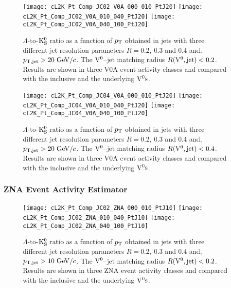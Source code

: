 \documentclass[12pt]{article}
\begin{document}
\begin{figure}[htbp]
\centering
\texttt{[image: cL2K\_Pt\_Comp\_JC02\_V0A\_000\_010\_PtJ20]}
\texttt{[image: cL2K\_Pt\_Comp\_JC02\_V0A\_010\_040\_PtJ20]}
\texttt{[image: cL2K\_Pt\_Comp\_JC02\_V0A\_040\_100\_PtJ20]}
\caption{$\Lambda$-to-${\rm K}_{\rm S}^{0}$ ratio as a function of $p_{\rm T}$
  obtained in jets with three different jet resolution
  parameters $R=0.2,~0.3$ and $0.4$ and, $p_{\rm T,jet}>20~{\rm GeV}/c$.
  The ${\rm V}^{0}$--jet matching radius $R({\rm V}^{0},{\rm jet})<0.2$.
  Results are shown in three V0A event activity classes and
  compared with the inclusive and the underlying ${\rm V}^{0}{\rm s}$.}
\label{fig:s01L2KJC02V0APtj20}
\end{figure}

\begin{figure}[htbp]
\centering
\texttt{[image: cL2K\_Pt\_Comp\_JC04\_V0A\_000\_010\_PtJ20]}
\texttt{[image: cL2K\_Pt\_Comp\_JC04\_V0A\_010\_040\_PtJ20]}
\texttt{[image: cL2K\_Pt\_Comp\_JC04\_V0A\_040\_100\_PtJ20]}
\caption{$\Lambda$-to-${\rm K}_{\rm S}^{0}$ ratio as a function of $p_{\rm T}$
  obtained in jets with three different jet resolution
  parameters $R=0.2,~0.3$ and $0.4$ and, $p_{\rm T,jet}>20~{\rm GeV}/c$.
  The ${\rm V}^{0}$--jet matching radius $R({\rm V}^{0},{\rm jet})<0.4$.
  Results are shown in three V0A event activity classes and
  compared with the inclusive and the underlying ${\rm V}^{0}{\rm s}$.}
\label{fig:s01L2KJC04V0APtj20}
\end{figure}

\newpage
\subsubsection{ZNA Event Activity Estimator}

\begin{figure}[htbp]
\centering
\texttt{[image: cL2K\_Pt\_Comp\_JC02\_ZNA\_000\_010\_PtJ10]}
\texttt{[image: cL2K\_Pt\_Comp\_JC02\_ZNA\_010\_040\_PtJ10]}
\texttt{[image: cL2K\_Pt\_Comp\_JC02\_ZNA\_040\_100\_PtJ10]}
\caption{$\Lambda$-to-${\rm K}_{\rm S}^{0}$ ratio as a function of $p_{\rm T}$
  obtained in jets with three different jet resolution
  parameters $R=0.2,~0.3$ and $0.4$ and, $p_{\rm T,jet}>10~{\rm GeV}/c$.
  The ${\rm V}^{0}$--jet matching radius $R({\rm V}^{0},{\rm jet})<0.2$.
  Results are shown in three ZNA event activity classes and
  compared with the inclusive and the underlying ${\rm V}^{0}{\rm s}$.}
\label{fig:s01L2KJC02ZNAPtj10}
\end{figure}
\end{document}
